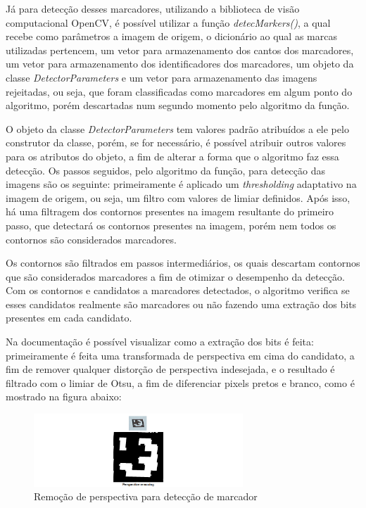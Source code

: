 \documentclass[12pt]{report}
\begin{document}
Já para detecção desses marcadores, utilizando a biblioteca de visão
computacional OpenCV, é possível utilizar a função {\it
  detecMarkers()}, a qual recebe como parâmetros a imagem de origem, o
dicionário ao qual as marcas utilizadas pertencem, um vetor para
armazenamento dos cantos dos marcadores, um vetor para armazenamento
dos identificadores dos marcadores, um objeto da classe {\it
  DetectorParameters} e um vetor para armazenamento das imagens
rejeitadas, ou seja, que foram classificadas como marcadores em algum
ponto do algoritmo, porém descartadas num segundo momento pelo
algoritmo da função.

O objeto da classe {\it DetectorParameters} tem valores padrão
atribuídos a ele pelo construtor da classe, porém, se for necessário,
é possível atribuir outros valores para os atributos do objeto, a fim
de alterar a forma que o algoritmo faz essa detecção. Os passos
seguidos, pelo algoritmo da função, para detecção das imagens são os
seguinte: primeiramente é aplicado um {\it thresholding} adaptativo na
imagem de origem, ou seja, um filtro com valores de limiar
definidos. Após isso, há uma filtragem dos contornos presentes na
imagem resultante do primeiro passo, que detectará os contornos
presentes na imagem, porém nem todos os contornos são considerados
marcadores.

Os contornos são filtrados em passos intermediários, os quais
descartam contornos que são considerados marcadores a fim de otimizar
o desempenho da detecção. Com os contornos e candidatos a marcadores
detectados, o algoritmo verifica se esses candidatos realmente são
marcadores ou não fazendo uma extração dos bits presentes em cada
candidato.

Na documentação é possível visualizar como a extração dos bits é
feita: primeiramente é feita uma transformada de perspectiva em cima
do candidato, a fim de remover qualquer distorção de perspectiva
indesejada, e o resultado é filtrado com o limiar de Otsu, a fim de
diferenciar pixels pretos e branco, como é mostrado na figura abaixo:

\begin{figure}[H]
  \centering
    \includegraphics[width=0.7\textwidth]{imagens/bitsextraction.png}
    \caption{Remoção de perspectiva para detecção de marcador}
  \label{fig:bitsextraction}
\end{figure}
\end{document}
